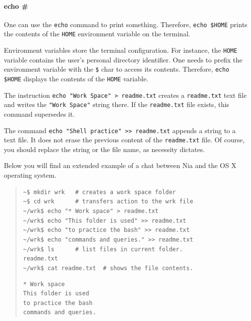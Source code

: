 \documentclass[a4paper,12pt]{book}
\begin{document}
\paragraph{echo \#} One can use the
\verb|echo| command to print something.
Therefore, \verb|echo $HOME| prints
the contents of the \verb|HOME|
environment variable on the terminal.

Environment variables store
the terminal configuration. For instance,
the \verb|HOME| variable contains
the user's personal directory identifier.
One needs to prefix the environment
variable with the \verb|$| char
to access its contents. Therefore,
\verb|echo $HOME| displays the
contents of the \verb|HOME| variable.

The instruction \verb|echo "Work Space" > readme.txt|
creates a \verb|readme.txt| text file and
writes the \verb|"Work Space"| string there.
If the \verb|readme.txt| file exists,
this command supersedes it.

The command \verb|echo "Shell practice" >> readme.txt|
appends a string to a text file. It does
not erase the previous content of
the \verb|readme.txt| file. Of course,
you should replace the string or the
file name, as necessity dictates.


Below you will find
an extended example of a chat between Nia and
the OS X operating system.
\begin{quote}
\verb|~$ mkdir wrk   # creates a work space folder      | \\
\verb|~$ cd wrk      # transfers action to the wrk file | \\
\verb|~/wrk$ echo "* Work space" > readme.txt | \\
\verb|~/wrk$ echo "This folder is used" >> readme.txt |\\
\verb|~/wrk$ echo "to practice the bash" >> readme.txt | \\
\verb|~/wrk$ echo "commands and queries." >> readme.txt | \\
\verb|~/wrk$ ls      # list files in current folder. | \\
\verb|readme.txt |\\
\verb|~/wrk$ cat readme.txt  # shows the file contents.| 
\begin{verbatim}
* Work space
This folder is used
to practice the bash
commands and queries.
\end{verbatim}
\end{quote}
\end{document}
